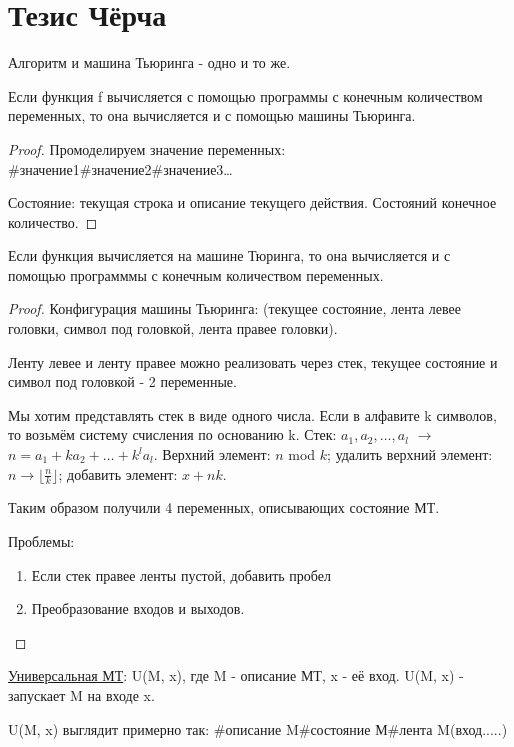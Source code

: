\section{Тезис Чёрча}

Алгоритм и машина Тьюринга - одно и то же.

\begin{theorem}
	Если функция f вычисляется с помощью программы с конечным количеством переменных, то она вычисляется и с помощью машины Тьюринга.
\end{theorem}
\begin{proof}
	Промоделируем значение переменных: \#значение1\#значение2\#значение3\dots

	Состояние: текущая строка и описание текущего действия. Состояний конечное количество.
\end{proof}

\begin{theorem}
	Если функция вычисляется на машине Тюринга, то она вычисляется и с помощью программмы с конечным количеством переменных.
\end{theorem}
\begin{proof}
	Конфигурация машины Тьюринга: (текущее состояние, лента левее головки, символ под головкой, лента правее головки).

	Ленту левее и ленту правее можно реализовать через стек, текущее состояние и символ под головкой - 2 переменные.

	Мы хотим представлять стек в виде одного числа. Если в алфавите k символов, то возьмём систему счисления по основанию k.
	Стек: $a_1, a_2, \dots, a_l$ $\longrightarrow$ $n = a_1 + ka_2 + \dots + k^la_l$. Верхний элемент: $n$ mod $k$; удалить верхний элемент: 
	$n \longrightarrow \lfloor \frac{n}{k} \rfloor$; добавить элемент: $x + nk$.

	Таким образом получили 4 переменных, описывающих состояние МТ.

	Проблемы:
	\begin{enumerate}
		\item Если стек правее ленты пустой, добавить пробел
		\item Преобразование входов и выходов.
	\end{enumerate} 
\end{proof}

\underline{Универсальная МТ}: U(M, x), где M - описание МТ, x - её вход. U(M, x) - запускает M на входе x.

U(M, x) выглядит примерно так: \#описание M\#состояние М\#лента M(вход.....)

